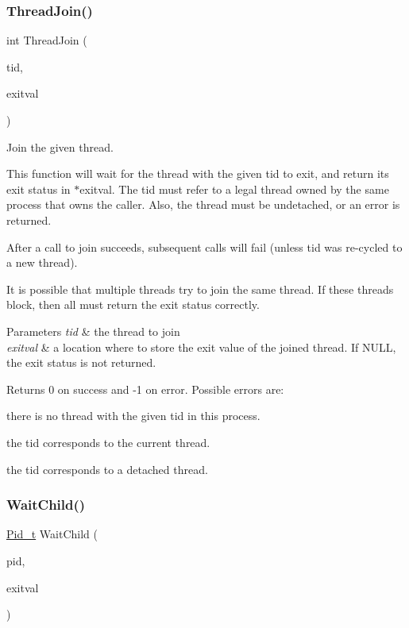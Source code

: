 \subsubsection{\texorpdfstring{Thread\+Join()}{ThreadJoin()}}
{\footnotesize\ttfamily int Thread\+Join (\begin{DoxyParamCaption}\item[{\hyperlink{group__syscalls_gaf67ad1c55e6b2a79bf8a99106380ce01}{Tid\+\_\+t}}]{tid,  }\item[{int $\ast$}]{exitval }\end{DoxyParamCaption})}



Join the given thread. 

This function will wait for the thread with the given tid to exit, and return its exit status in {\ttfamily $\ast$exitval}. The tid must refer to a legal thread owned by the same process that owns the caller. Also, the thread must be undetached, or an error is returned.

After a call to join succeeds, subsequent calls will fail (unless tid was re-\/cycled to a new thread).

It is possible that multiple threads try to join the same thread. If these threads block, then all must return the exit status correctly.


\begin{DoxyParams}{Parameters}
{\em tid} & the thread to join \\
\hline
{\em exitval} & a location where to store the exit value of the joined thread. If N\+U\+LL, the exit status is not returned. \\
\hline
\end{DoxyParams}
\begin{DoxyReturn}{Returns}
0 on success and -\/1 on error. Possible errors are\+:
\begin{DoxyItemize}
\item there is no thread with the given tid in this process.
\item the tid corresponds to the current thread.
\item the tid corresponds to a detached thread. 
\end{DoxyItemize}
\end{DoxyReturn}
\mbox{\label{group__syscalls_ga37017afba05480740d26b033975fef03}} 
\subsubsection{\texorpdfstring{Wait\+Child()}{WaitChild()}}
{\footnotesize\ttfamily \hyperlink{group__syscalls_gafac07f3170763932fac97b6eab2c3984}{Pid\+\_\+t} Wait\+Child (\begin{DoxyParamCaption}\item[{\hyperlink{group__syscalls_gafac07f3170763932fac97b6eab2c3984}{Pid\+\_\+t}}]{pid,  }\item[{int $\ast$}]{exitval }\end{DoxyParamCaption})}




